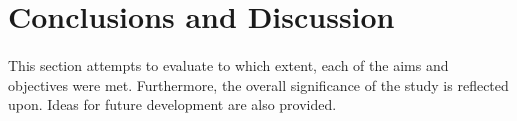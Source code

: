 \documentclass[11pt,english,twoside]{article}
\begin{document}
























\newpage

\section{Conclusions and Discussion}
\paragraph{}
This section attempts to evaluate to which extent, each of the aims and objectives were met. Furthermore, the overall significance of the study is reflected upon. Ideas for future development are also provided. 
\end{document}
